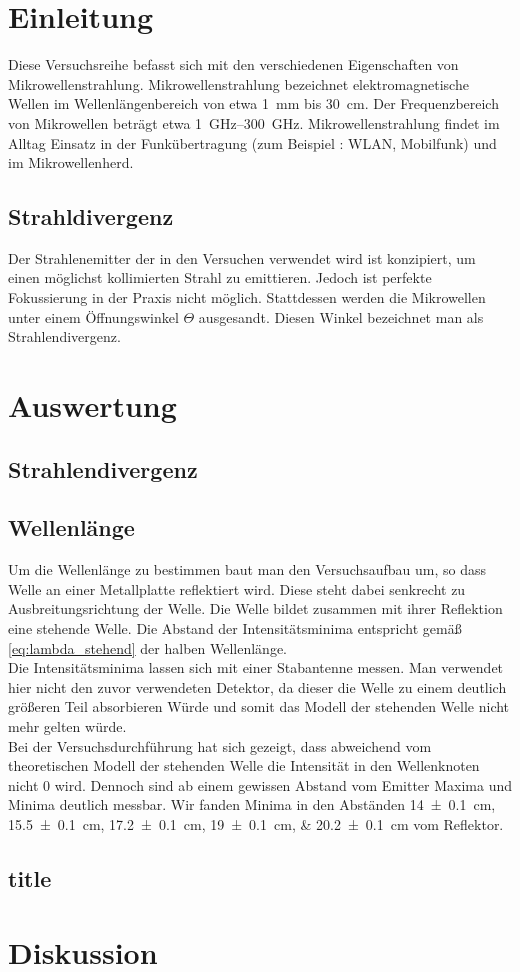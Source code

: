 \section{Einleitung}
Diese Versuchsreihe befasst sich mit den verschiedenen Eigenschaften von Mikrowellenstrahlung. Mikrowellenstrahlung bezeichnet elektromagnetische Wellen im Wellenlängenbereich von etwa \SI{1}{\milli\meter} bis \SI{30}{\centi\meter}. Der Frequenzbereich von Mikrowellen beträgt etwa \SIrange{1}{300}{\giga\hertz}. Mikrowellenstrahlung findet im Alltag Einsatz in der Funkübertragung (zum Beispiel : WLAN, Mobilfunk) und im Mikrowellenherd.
\subsection{Strahldivergenz}
Der Strahlenemitter der in den Versuchen verwendet wird ist konzipiert, um einen möglichst kollimierten Strahl zu emittieren. Jedoch ist perfekte Fokussierung in der Praxis nicht möglich. Stattdessen werden die Mikrowellen unter einem Öffnungswinkel $ \Theta $ ausgesandt. Diesen Winkel bezeichnet man als Strahlendivergenz.
\newpage
\section{Auswertung}

\subsection{Strahlendivergenz}
\subsection{Wellenlänge}
Um die Wellenlänge zu bestimmen baut man den Versuchsaufbau um, so dass Welle an einer Metallplatte reflektiert wird. Diese steht dabei senkrecht zu Ausbreitungsrichtung der Welle. Die Welle bildet zusammen mit ihrer Reflektion eine stehende Welle. Die Abstand der Intensitätsminima entspricht gemäß \eqref{eq:lambda_stehend} der halben Wellenlänge. \\
Die Intensitätsminima lassen sich mit einer Stabantenne messen. Man verwendet hier nicht den zuvor verwendeten Detektor, da dieser die Welle zu einem deutlich größeren Teil absorbieren Würde und somit das Modell der stehenden Welle nicht mehr gelten würde. \\
Bei der Versuchsdurchführung hat sich gezeigt, dass abweichend vom theoretischen Modell der stehenden Welle die Intensität in den Wellenknoten nicht $ 0 $ wird. Dennoch sind ab einem gewissen Abstand vom Emitter Maxima und Minima deutlich messbar. Wir fanden Minima in den Abständen \SIlist{14+-.1; 15,5+-.1; 17,2+-.1; 19+-.1; 20,2+-.1}{\centi\meter} vom Reflektor.
\subsection{}
\subsection{title}
\newpage
\section{Diskussion} 
